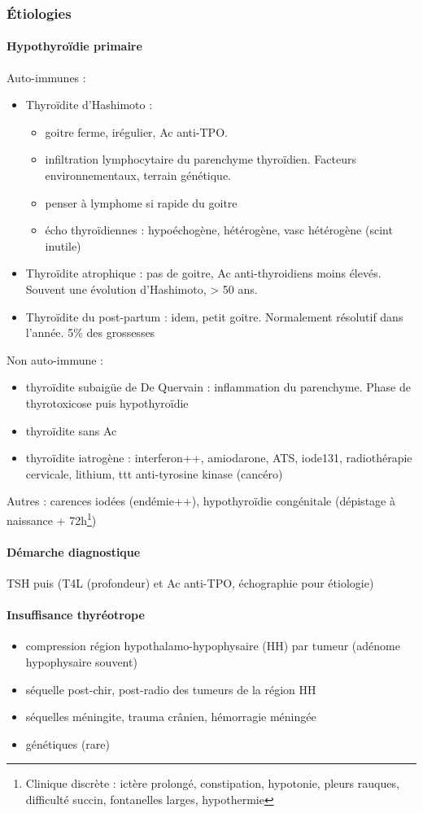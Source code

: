 \documentclass[11pt]{article}
\begin{document}
\subsubsection{Étiologies}
\label{sec:org4cf693b}
\paragraph{Hypothyroïdie primaire}
\label{sec:orge0d0196}
Auto-immunes :
\begin{itemize}
\item Thyroïdite d'Hashimoto : 
\begin{itemize}
\item goitre ferme, irégulier, Ac anti-TPO.
\item infiltration lymphocytaire du parenchyme thyroïdien. Facteurs environnementaux,
terrain génétique.
\item penser à lymphome si \inc rapide du goitre
\item écho thyroïdiennes : hypoéchogène, hétérogène, vasc hétérogène (scint
inutile)
\end{itemize}
\item Thyroïdite atrophique : pas de goitre, Ac anti-thyroidiens moins
élevés. Souvent une évolution d'Hashimoto, > 50 ans.
\item Thyroïdite du post-partum : idem, petit goitre. Normalement résolutif dans
l'année. 5\% des grossesses
\end{itemize}
Non auto-immune :
\begin{itemize}
\item thyroïdite subaigüe de De Quervain : inflammation du parenchyme. Phase de
thyrotoxicose puis hypothyroïdie
\item thyroïdite sans Ac
\item thyroïdite iatrogène : interferon++, amiodarone, ATS, iode131, radiothérapie
cervicale, lithium, ttt anti-tyrosine kinase (cancéro)
\end{itemize}
Autres : carences iodées (endémie++), hypothyroïdie congénitale (dépistage à
naissance + 72h\footnote{Clinique discrète : ictère prolongé, constipation, hypotonie, pleurs
rauques, difficulté succin, fontanelles larges, hypothermie})

\paragraph{Démarche diagnostique}
\label{sec:org9c2a7c9}
TSH puis (T4L (profondeur) et Ac anti-TPO, échographie pour étiologie)
\paragraph{Insuffisance thyréotrope}
\label{sec:orgfbf334c}
\begin{itemize}
\item compression région hypothalamo-hypophysaire (HH) par tumeur (adénome hypophysaire
souvent)
\item séquelle post-chir, post-radio des tumeurs de la région HH
\item séquelles méningite, trauma crânien, hémorragie méningée
\item génétiques (rare)
\end{itemize}
\end{document}
